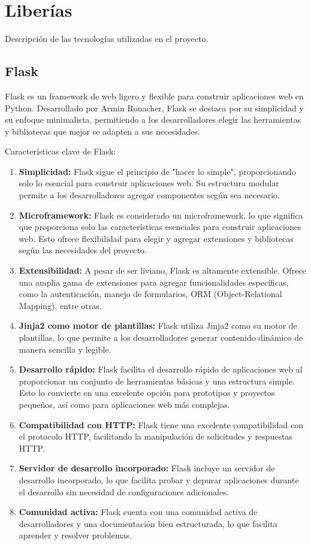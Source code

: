 \documentclass[a4paper, 12pt]{book}
\begin{document}
\section{Liberías}
\label{sec:Librerias}

Descripción de las tecnologías utilizadas en el proyecto. 

\subsection{Flask}
\label{subsec:flask}
Flask es un framework de web ligero y flexible para construir aplicaciones web en Python. Desarrollado por Armin Ronacher, 
Flask se destaca por su simplicidad y su enfoque minimalista, permitiendo a los desarrolladores elegir las herramientas y 
bibliotecas que mejor se adapten a sus necesidades.

Características clave de Flask:
\begin{enumerate}
  \item \textbf{Simplicidad:} Flask sigue el principio de "hacer lo simple", proporcionando solo lo esencial para construir aplicaciones web. Su estructura modular permite a los desarrolladores agregar componentes según sea necesario.
  \item \textbf{Microframework:} Flask es considerado un microframework, lo que significa que proporciona solo las características esenciales para construir aplicaciones web. Esto ofrece flexibilidad para elegir y agregar extensiones y bibliotecas según las necesidades del proyecto.
  \item \textbf{Extensibilidad:} A pesar de ser liviano, Flask es altamente extensible. Ofrece una amplia gama de extensiones para agregar funcionalidades específicas, como la autenticación, manejo de formularios, ORM (Object-Relational Mapping), entre otras.
  \item \textbf{Jinja2 como motor de plantillas:} Flask utiliza Jinja2 como su motor de plantillas, lo que permite a los desarrolladores generar contenido dinámico de manera sencilla y legible.
  \item \textbf{Desarrollo rápido:} Flask facilita el desarrollo rápido de aplicaciones web al proporcionar un conjunto de herramientas básicas y una estructura simple. Esto lo convierte en una excelente opción para prototipos y proyectos pequeños, así como para aplicaciones web más complejas.
  \item \textbf{Compatibilidad con HTTP:} Flask tiene una excelente compatibilidad con el protocolo HTTP, facilitando la manipulación de solicitudes y respuestas HTTP.
  \item \textbf{Servidor de desarrollo incorporado:} Flask incluye un servidor de desarrollo incorporado, lo que facilita probar y depurar aplicaciones durante el desarrollo sin necesidad de configuraciones adicionales.
  \item \textbf{Comunidad activa:} Flask cuenta con una comunidad activa de desarrolladores y una documentación bien estructurada, lo que facilita aprender y resolver problemas.
\end{enumerate}
\end{document}
